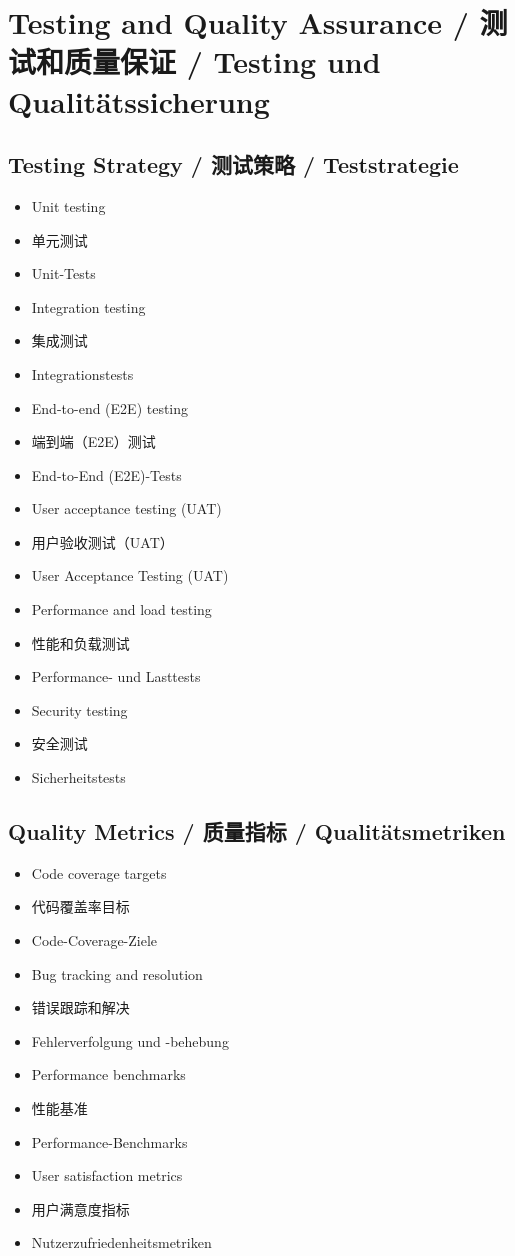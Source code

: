 \section{Testing and Quality Assurance / 测试和质量保证 / Testing und Qualitätssicherung}

\subsection{Testing Strategy / 测试策略 / Teststrategie}
\begin{itemize}
    \item Unit testing
    \item 单元测试
    \item Unit-Tests
    \item Integration testing
    \item 集成测试
    \item Integrationstests
    \item End-to-end (E2E) testing
    \item 端到端（E2E）测试
    \item End-to-End (E2E)-Tests
    \item User acceptance testing (UAT)
    \item 用户验收测试（UAT）
    \item User Acceptance Testing (UAT)
    \item Performance and load testing
    \item 性能和负载测试
    \item Performance- und Lasttests
    \item Security testing
    \item 安全测试
    \item Sicherheitstests
\end{itemize}

\subsection{Quality Metrics / 质量指标 / Qualitätsmetriken}
\begin{itemize}
    \item Code coverage targets
    \item 代码覆盖率目标
    \item Code-Coverage-Ziele
    \item Bug tracking and resolution
    \item 错误跟踪和解决
    \item Fehlerverfolgung und -behebung
    \item Performance benchmarks
    \item 性能基准
    \item Performance-Benchmarks
    \item User satisfaction metrics
    \item 用户满意度指标
    \item Nutzerzufriedenheitsmetriken
\end{itemize}

